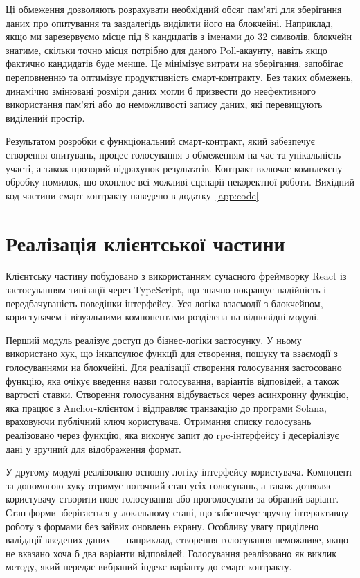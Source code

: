 \documentclass[14pt]{extreport}
\begin{document}
  Ці обмеження дозволяють розрахувати необхідний обсяг пам'яті для зберігання даних про опитування та заздалегідь виділити його на блокчейні. Наприклад, якщо ми зарезервуємо місце під 8 кандидатів з іменами до 32 символів, блокчейн знатиме, скільки точно місця потрібно для даного Poll-акаунту, навіть якщо фактично кандидатів буде менше. Це мінімізує витрати на зберігання, запобігає переповненню та оптимізує продуктивність смарт-контракту. Без таких обмежень, динамічно змінювані розміри даних могли б призвести до неефективного використання пам'яті або до неможливості запису даних, які перевищують виділений простір.

  Результатом розробки є функціональний смарт-контракт, який забезпечує створення опитувань, процес голосування з обмеженням на час та унікальність участі, а також прозорий підрахунок результатів. Контракт включає комплексну обробку помилок, що охоплює всі можливі сценарії некоректної роботи. Вихідний код частини смарт-контракту наведено в додатку~\ref{app:code}
  
  \section{Реалізація клієнтської частини}
  
  Клієнтську частину побудовано з використанням сучасного фреймворку Re\-act із застосуванням типізації через TypeScript, що значно покращує надійність і передбачуваність поведінки інтерфейсу. Уся логіка взаємодії з блокчейном, користувачем і візуальними компонентами розділена на відповідні модулі.

  Перший модуль реалізує доступ до бізнес-логіки застосунку. У ньому використано хук, що інкапсулює функції для створення, пошуку та взаємодії з голосуваннями на блокчейні. Для реалізації створення голосування застосовано функцію, яка очікує введення назви голосування, варіантів відповідей, а також вартості ставки. Створення голосування відбувається через асинхронну функцію, яка працює з Anchor-клієнтом і відправляє транзакцію до програми Solana, враховуючи публічний ключ користувача. Отримання списку голосувань реалізовано через функцію, яка виконує запит до \gls{rpc}-інтерфейсу і десеріалізує дані у зручний для відображення формат.

  У другому модулі реалізовано основну логіку інтерфейсу користувача. Компонент за допомогою хуку отримує поточний стан усіх голосувань, а також дозволяє користувачу створити нове голосування або проголосувати за обраний варіант. Стан форми зберігається у локальному стані, що забезпечує зручну інтерактивну роботу з формами без зайвих оновлень екрану. Особливу увагу приділено валідації введених даних — наприклад, створення голосування неможливе, якщо не вказано хоча б два варіанти відповідей. Голосування реалізовано як виклик методу, який передає вибраний індекс варіанту до смарт-контракту.
\end{document}
